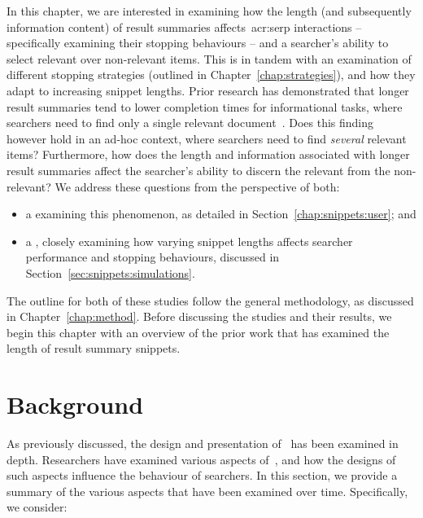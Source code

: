 
In this chapter, we are interested in examining how the length (and subsequently information content) of result summaries affects~\gls{acr:serp} interactions -- specifically examining their stopping behaviours -- and a searcher's ability to select relevant over non-relevant items. This is in tandem with an examination of different stopping strategies (outlined in Chapter~\ref{chap:strategies}), and how they adapt to increasing snippet lengths. Prior research has demonstrated that longer result summaries tend to lower completion times for informational tasks, where searchers need to find only a single relevant document~\citep{cutrell2007eye_tracking}. Does this finding however hold in an ad-hoc context, where searchers need to find \emph{several} relevant items? Furthermore, how does the length and information associated with longer result summaries affect the searcher's ability to discern the relevant from the non-relevant? We address these questions from the perspective of both:

\begin{itemize}
    \item{a  examining this phenomenon, as detailed in Section~\ref{chap:snippets:user}; and}
    \item{a , closely examining how varying snippet lengths affects searcher performance and stopping behaviours, discussed in Section~\ref{sec:snippets:simulations}.}
\end{itemize}

The outline for both of these studies follow the general methodology, as discussed in Chapter~\ref{chap:method}. Before discussing the studies and their results, we begin this chapter with an overview of the prior work that has examined the length of result summary snippets.

\section{Background}\label{chap:snippets:background}
As previously discussed, the design and presentation of~ has been examined in depth. Researchers have examined various aspects of~, and how the designs of such aspects influence the behaviour of searchers. In this section, we provide a summary of the various aspects that have been examined over time. Specifically, we consider:

